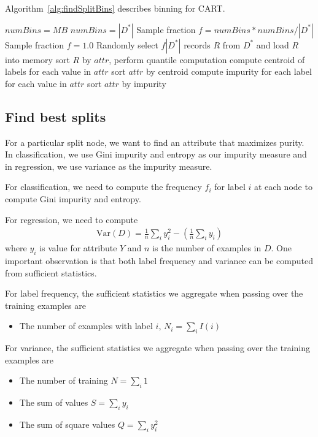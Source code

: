Algorithm~\ref{alg:findSplitBins} describes binning for CART.

\begin{algorithm}[findSplitBins$(D^*, MB)$] \label{alg:findSplitBins}
\begin{algorithmic}[1]
        \State $numBins = MB$
    \Else
        \State $numBins = \left|D^*\right|$
    \EndIf
        \State Sample fraction $f = numBins * numBins/{\left|D^*\right|}$
    \Else
        \State Sample fraction $f = 1.0$
    \EndIf
    \State Randomly select $f\left| D^* \right|$ records $R$ from $D^*$ and load $R$ into memory
            \State sort $R$ by $attr$, perform quantile computation
        \Else
                \State compute centroid of labels for each value in $attr$
                \State sort $attr$ by centroid
            \Else
                \State compute impurity for each label for each value in $attr$
                \State sort $attr$ by impurity
            \EndIf
        \EndIf
    \EndFor
\end{algorithmic}
\end{algorithm}

\subsection{Find best splits}
For a particular split node, we want to find an attribute that maximizes purity.
In classification, we use Gini impurity and entropy as our impurity measure and
in regression, we use variance as the impurity measure.

For classification, we need to compute the frequency $f_i$ for label $i$ at each
node to compute Gini impurity and entropy.

For regression, we need to compute
\begin{align*}
    \text{Var}(D) = \frac{1}{n} \sum_{i} y_i^2 - \left(\frac{1}{n} \sum_{i}y_{i} \right)
\end{align*}
where $y_{i}$ is value for attribute $Y$ and $n$ is the number of examples in $D$.
One important observation is that both label frequency and variance can be
computed from sufficient statistics.

For label frequency, the sufficient statistics we aggregate when passing over
the training examples are
\begin{itemize}
\item The number of examples with label $i$, $N_i = \sum_i I(i)$
\end{itemize}
For variance, the sufficient statistics we aggregate when passing over the
training examples are
\begin{itemize}
\item The number of training $N = \sum_i 1$
\item The sum of values $S = \sum_i y_i$
\item The sum of square values $Q = \sum_i y_i^2$
\end{itemize}

